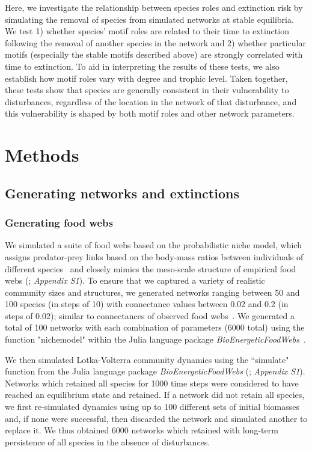\documentclass[12pt]{article}
\begin{document}
\begin{spacing}{2.0}
    
    Here, we investigate the relationship between species roles and extinction risk by simulating the removal of species from simulated networks at stable equilibria. 
    We test 1) whether species' motif roles are related to their time to extinction following the removal of another species in the network and 2) whether particular motifs (especially the stable motifs described above) are strongly correlated with time to extinction.
    To aid in interpreting the results of these tests, we also establish how motif roles vary with degree and trophic level.
    Taken together, these tests show that species are generally consistent in their vulnerability to disturbances, regardless of the location in the network of that disturbance, and this vulnerability is shaped by both motif roles and other network parameters.


\section*{Methods}

    \subsection*{Generating networks and extinctions}

    	\subsubsection*{Generating food webs}
    
            We simulated a suite of food webs based on the probabilistic niche model, which assigns predator-prey links based on the body-mass ratios between individuals of different species~\citep{Williams2000,Delmas2017} and closely mimics the meso-scale structure of empirical food webs (\citealp{Stouffer2007}; \emph{Appendix S1}).
            To ensure that we captured a variety of realistic community sizes and structures, we generated networks ranging between 50 and 100 species (in steps of 10) with connectance values between 0.02 and 0.2 (in steps of 0.02); similar to connectances of observed food webs~\citep{Dunne2002e}. 
            We generated a total of 100 networks with each combination of parameters (6000 total) using the function "nichemodel" within the Julia language package \emph{BioEnergeticFoodWebs}~\citep{bioenergeticfw,Delmas2017}.


            We then simulated Lotka-Volterra community dynamics using the ``simulate" function from the Julia language package \emph{BioEnergeticFoodWebs} (\citealp{bioenergeticfw,Delmas2017}; \emph{Appendix S1}).
            Networks which retained all species for 1000 time steps were considered to have reached an equilibrium state and retained.
            If a network did not retain all species, we first re-simulated dynamics using up to 100 different sets of initial biomasses and, if none were successful, then discarded the network and simulated another to replace it.
            We thus obtained 6000 networks which retained with long-term persistence of all species in the absence of disturbances.


\end{spacing}
\end{document}
